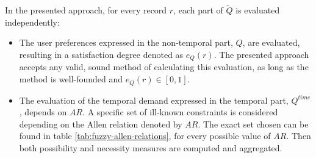 

In the presented approach, for every record $r$, each part of $\tilde{Q}$ is evaluated independently:
\begin{itemize}
\item
The user preferences expressed in the non-temporal part, $Q$, are evaluated, resulting in a satisfaction degree denoted as $e_Q(r)$. The presented approach accepts any valid, sound method of calculating this evaluation, as long as the method is well-founded and $e_Q(r) \in \left[0,1\right]$.
\item
The evaluation of the temporal demand expressed in the temporal part, $Q^{time}$, depends on $AR$. A specific set of ill-known constraints is considered depending on the Allen relation denoted by $AR$. The exact set chosen can be found in table \ref{tab:fuzzy-allen-relations}, for every possible value of $AR$. Then both possibility and necessity measures are computed and aggregated.
\end{itemize}

